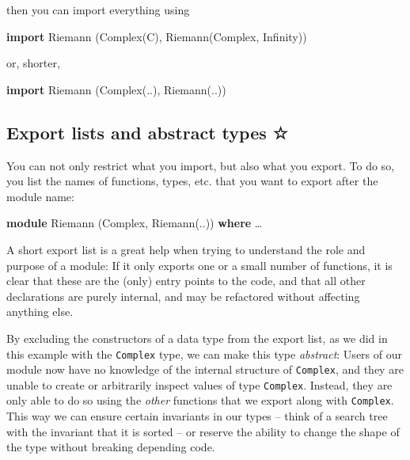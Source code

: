 \documentclass[11pt,
  american,
  DIV13]{article}
\newenvironment{Shaded}{}{}
\newcommand{\DataTypeTok}[1]{\textcolor[rgb]{0.56,0.13,0.00}{#1}}
\newcommand{\KeywordTok}[1]{\textcolor[rgb]{0.00,0.44,0.13}{\textbf{#1}}}
\newcommand{\NormalTok}[1]{#1}
\newcommand{\OperatorTok}[1]{\textcolor[rgb]{0.40,0.40,0.40}{#1}}
\begin{document}
then you can import everything using

\begin{Shaded}
\begin{Highlighting}[]
\KeywordTok{import} \DataTypeTok{Riemann}\NormalTok{ (}\DataTypeTok{Complex}\NormalTok{(}\DataTypeTok{C}\NormalTok{), }\DataTypeTok{Riemann}\NormalTok{(}\DataTypeTok{Complex}\NormalTok{, }\DataTypeTok{Infinity}\NormalTok{))}
\end{Highlighting}
\end{Shaded}

or, shorter,

\begin{Shaded}
\begin{Highlighting}[]
\KeywordTok{import} \DataTypeTok{Riemann}\NormalTok{ (}\DataTypeTok{Complex}\NormalTok{(..), }\DataTypeTok{Riemann}\NormalTok{(..))}
\end{Highlighting}
\end{Shaded}

\hypertarget{export-lists-and-abstract-types}{%
\subsection{Export lists and abstract types
☆}\label{export-lists-and-abstract-types}}

You can not only restrict what you import, but also what you export. To
do so, you list the names of functions, types, etc. that you want to
export after the module name:

\begin{Shaded}
\begin{Highlighting}[]
\KeywordTok{module} \DataTypeTok{Riemann}\NormalTok{ (}\DataTypeTok{Complex}\NormalTok{, }\DataTypeTok{Riemann}\NormalTok{(}\OperatorTok{..}\NormalTok{)) }\KeywordTok{where}
\NormalTok{…}
\end{Highlighting}
\end{Shaded}

A short export list is a great help when trying to understand the role
and purpose of a module: If it only exports one or a small number of
functions, it is clear that these are the (only) entry points to the
code, and that all other declarations are purely internal, and may be
refactored without affecting anything else.

By excluding the constructors of a data type from the export list, as we
did in this example with the \texttt{Complex} type, we can make this
type \emph{abstract}: Users of our module now have no knowledge of the
internal structure of \texttt{Complex}, and they are unable to create or
arbitrarily inspect values of type \texttt{Complex}. Instead, they are
only able to do so using the \emph{other} functions that we export along
with \texttt{Complex}. This way we can ensure certain invariants in our
types -- think of a search tree with the invariant that it is sorted --
or reserve the ability to change the shape of the type without breaking
depending code.
\end{document}
